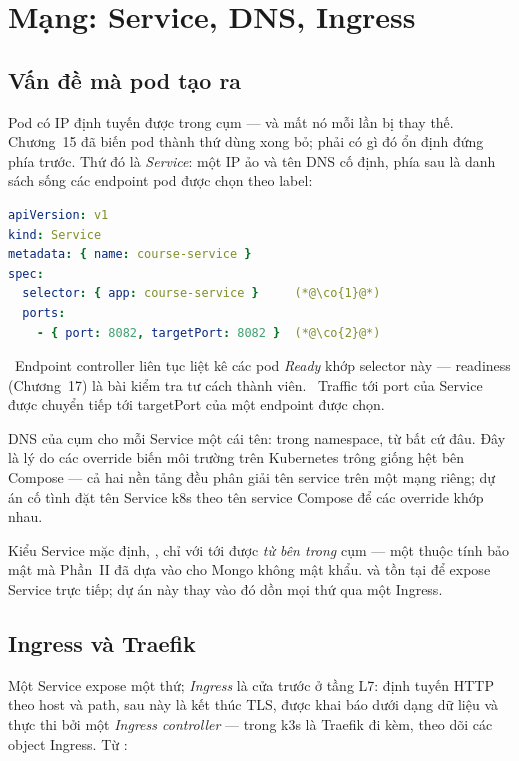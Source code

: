 \chapter{Mạng: Service, DNS, Ingress}
\label{ch:networking}

\section{Vấn đề mà pod tạo ra}

Pod có IP định tuyến được trong cụm --- và mất nó mỗi lần bị thay thế.
Chương~15 đã biến pod thành thứ dùng xong bỏ; phải có gì đó ổn định đứng
phía trước. Thứ đó là \emph{Service}: một IP ảo và tên DNS cố định, phía
sau là danh sách sống các endpoint pod được chọn theo label:

\begin{lstlisting}[language=yaml]
apiVersion: v1
kind: Service
metadata: { name: course-service }
spec:
  selector: { app: course-service }     (*@\co{1}@*)
  ports:
    - { port: 8082, targetPort: 8082 }  (*@\co{2}@*)
\end{lstlisting}

~Endpoint controller liên tục liệt kê các pod \emph{Ready} khớp
selector này --- readiness (Chương~17) là bài kiểm tra tư cách thành
viên. ~Traffic tới port của Service được chuyển tiếp tới targetPort
của một endpoint được chọn.

DNS của cụm cho mỗi Service một cái tên:  trong
namespace,  từ bất cứ đâu.
Đây là lý do các override biến môi trường trên Kubernetes trông giống
hệt bên Compose --- cả hai nền tảng đều phân giải tên service trên một
mạng riêng; dự án cố tình đặt tên Service k8s theo tên service Compose
để các override khớp nhau.

Kiểu Service mặc định, , chỉ với tới được \emph{từ bên
trong} cụm --- một thuộc tính bảo mật mà Phần~II đã dựa vào cho Mongo
không mật khẩu.  và  tồn tại để expose
Service trực tiếp; dự án này thay vào đó dồn mọi thứ qua một Ingress.

\section{Ingress và Traefik}

Một Service expose một thứ; \emph{Ingress} là cửa trước ở tầng L7: định
tuyến HTTP theo host và path, sau này là kết thúc TLS, được khai báo
dưới dạng dữ liệu và thực thi bởi một \emph{Ingress controller} ---
trong k3s là Traefik đi kèm, theo dõi các object Ingress. Từ
:

